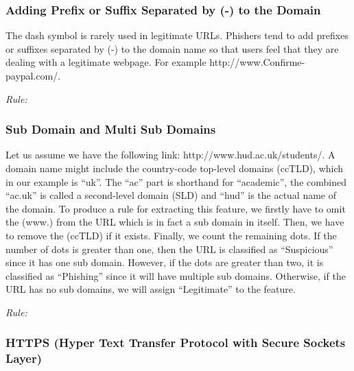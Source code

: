 \documentclass[twocolumn,10pt]{article}
\begin{document}
\subsubsection{Adding Prefix or Suffix Separated by (-) to the Domain}

The dash symbol is rarely used in legitimate URLs. Phishers tend to add prefixes or suffixes separated by (-) to the domain name so that users feel that they are dealing with a legitimate webpage. For example http://www.Confirme-paypal.com/.
\begin{center}
\it Rule:
\end{center}
\subsubsection{Sub Domain and Multi Sub Domains}

Let us assume we have the following link: http://www.hud.ac.uk/students/. A domain name might include the country-code top-level domains (ccTLD), which in our example is “uk”. The “ac” part is shorthand for “academic”, the combined “ac.uk” is called a second-level domain (SLD) and “hud” is the actual name of the domain. To produce a rule for extracting this feature, we firstly have to omit the (www.) from the URL which is in fact a sub domain in itself. Then, we have to remove the (ccTLD) if it exists. Finally, we count the remaining dots. If the number of dots is greater than one, then the URL is classified as “Suspicious” since it has one sub domain. However, if the dots are greater than two, it is classified as “Phishing” since it will have multiple sub domains. Otherwise, if the URL has no sub domains, we will assign “Legitimate” to the feature.  
\begin{center}
\it Rule:
\end{center}
\subsubsection{HTTPS (Hyper Text Transfer Protocol with Secure Sockets Layer)}
\end{document}
